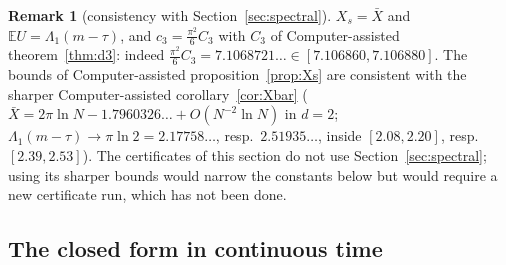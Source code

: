 \documentclass[10pt,a4paper]{article}
\theoremstyle{plain}
\theoremstyle{definition}
\newtheorem{remark}[theorem]{Remark}
\newcommand{\E}{\mathbb{E}}
\newcommand{\Xb}{\bar X}
\begin{document}
\begin{remark}[consistency with Section~\ref{sec:spectral}]\label{rem:consistency}
$X_s=\Xb$ and $\E U=\Lambda_1(m-\tau)$, and $c_3=\frac{\pi^2}6C_3$ with $C_3$ of Computer-assisted theorem~\ref{thm:d3}: indeed $\frac{\pi^2}6C_3=7.1068721\ldots\in[7.106860,7.106880]$. The bounds of Computer-assisted proposition~\ref{prop:Xs} are consistent with the sharper Computer-assisted corollary~\ref{cor:Xbar} ($\Xb=2\pi\ln N-1.7960326\ldots+O(N^{-2}\ln N)$ in $d=2$; $\Lambda_1(m-\tau)\to\pi\ln2=2.17758\ldots$, resp.\ $2.51935\ldots$, inside $[2.08,2.20]$, resp.\ $[2.39,2.53]$). The certificates of this section do not use Section~\ref{sec:spectral}; using its sharper bounds would narrow the constants below but would require a new certificate run, which has not been done.
\end{remark}

\subsection{The closed form in continuous time}
\end{document}
